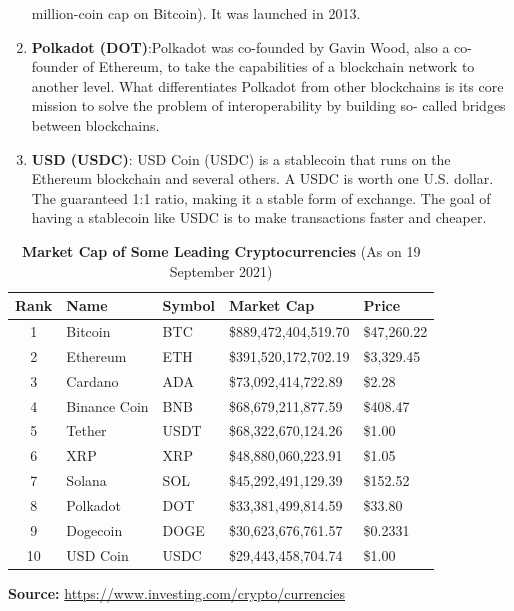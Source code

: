 \documentclass[11pt]{article}
\begin{document}
\begin{enumerate}
    million-coin cap on Bitcoin). It was launched in 2013. 
    \item \textbf{Polkadot (DOT)}:Polkadot was co-founded by Gavin Wood, also a co-founder of Ethereum, to 
    take the capabilities of a blockchain network to another level. What differentiates Polkadot from 
    other blockchains is its core mission to solve the problem of interoperability by building so- 
    called bridges between blockchains. 
    \item \textbf{USD (USDC)}: USD Coin (USDC) is a stablecoin that runs on the Ethereum blockchain and 
    several others. A USDC is worth one U.S. dollar. The guaranteed 1:1 ratio, making it a stable 
    form of exchange. The goal of having a stablecoin like USDC is to make transactions faster and 
    cheaper.
\end{enumerate}

\begin{table}[h]
    \centering
    \caption{\textbf{Market Cap of Some Leading Cryptocurrencies }(As on 19 September 2021)}
    \renewcommand{\arraystretch}{1.8} %
    \setlength{\tabcolsep}{11pt} %
    \begin{tabular}{|c|l|l|l|l|}
        \hline
        \textbf{Rank} & \textbf{Name} & \textbf{Symbol} & \textbf{Market Cap} & \textbf{Price} \\ \hline
        1 & Bitcoin & BTC & \$889,472,404,519.70 & \$47,260.22 \\ \hline
        2 & Ethereum & ETH & \$391,520,172,702.19 & \$3,329.45 \\ \hline
        3 & Cardano & ADA & \$73,092,414,722.89 & \$2.28 \\ \hline
        4 & Binance Coin & BNB & \$68,679,211,877.59 & \$408.47 \\ \hline
        5 & Tether & USDT & \$68,322,670,124.26 & \$1.00 \\ \hline
        6 & XRP & XRP & \$48,880,060,223.91 & \$1.05 \\ \hline
        7 & Solana & SOL & \$45,292,491,129.39 & \$152.52 \\ \hline
        8 & Polkadot & DOT & \$33,381,499,814.59 & \$33.80 \\ \hline
        9 & Dogecoin & DOGE & \$30,623,676,761.57 & \$0.2331 \\ \hline
        10 & USD Coin & USDC & \$29,443,458,704.74 & \$1.00 \\ \hline
    \end{tabular}
    
    \textbf{Source:} \url{https://www.investing.com/crypto/currencies}
\end{table}
\end{document}
